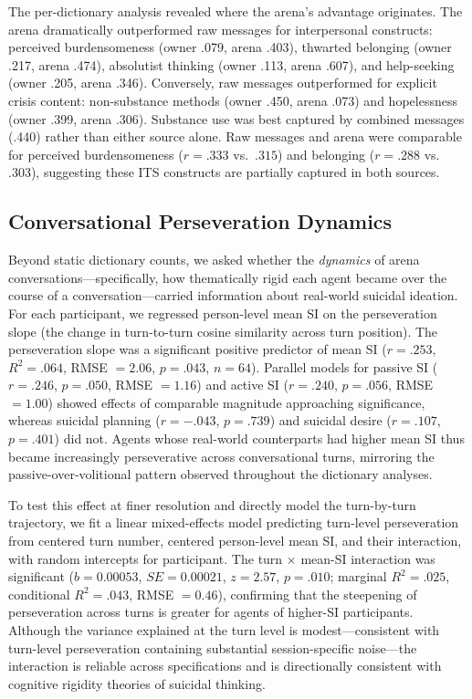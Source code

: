 \documentclass[review,12pt,authoryear]{elsarticle}
\begin{document}
The per-dictionary analysis revealed where the arena's advantage originates. The arena dramatically outperformed raw messages for interpersonal constructs: perceived burdensomeness (owner .079, arena .403), thwarted belonging (owner .217, arena .474), absolutist thinking (owner .113, arena .607), and help-seeking (owner .205, arena .346). Conversely, raw messages outperformed for explicit crisis content: non-substance methods (owner .450, arena .073) and hopelessness (owner .399, arena .306). Substance use was best captured by combined messages (.440) rather than either source alone. Raw messages and arena were comparable for perceived burdensomeness ($r = .333$ vs.\ $.315$) and belonging ($r = .288$ vs.\ $.303$), suggesting these ITS constructs are partially captured in both sources.

\subsection{Conversational Perseveration Dynamics}

Beyond static dictionary counts, we asked whether the \textit{dynamics} of arena conversations---specifically, how thematically rigid each agent became over the course of a conversation---carried information about real-world suicidal ideation. For each participant, we regressed person-level mean SI on the perseveration slope (the change in turn-to-turn cosine similarity across turn position). The perseveration slope was a significant positive predictor of mean SI ($r = .253$, $R^2 = .064$, RMSE $= 2.06$, $p = .043$, $n = 64$). Parallel models for passive SI ($r = .246$, $p = .050$, RMSE $= 1.16$) and active SI ($r = .240$, $p = .056$, RMSE $= 1.00$) showed effects of comparable magnitude approaching significance, whereas suicidal planning ($r = -.043$, $p = .739$) and suicidal desire ($r = .107$, $p = .401$) did not. Agents whose real-world counterparts had higher mean SI thus became increasingly perseverative across conversational turns, mirroring the passive-over-volitional pattern observed throughout the dictionary analyses.

To test this effect at finer resolution and directly model the turn-by-turn trajectory, we fit a linear mixed-effects model predicting turn-level perseveration from centered turn number, centered person-level mean SI, and their interaction, with random intercepts for participant. The turn $\times$ mean-SI interaction was significant ($b = 0.00053$, $SE = 0.00021$, $z = 2.57$, $p = .010$; marginal $R^2 = .025$, conditional $R^2 = .043$, RMSE $= 0.46$), confirming that the steepening of perseveration across turns is greater for agents of higher-SI participants. Although the variance explained at the turn level is modest---consistent with turn-level perseveration containing substantial session-specific noise---the interaction is reliable across specifications and is directionally consistent with cognitive rigidity theories of suicidal thinking.
\end{document}
